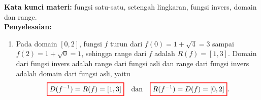 \documentclass[10pt,openany,a4paper]{article}
\theoremstyle{definition}
\theoremstyle{definition}
\theoremstyle{plain}
\newenvironment{jawab}[2][tes]{%
\par\noindent\textbf{Kata kunci materi:} #1.\\
\textbf{Penyelesaian:} #2%
}{}
\begin{document}
\begin{enumerate}
\begin{jawab}[fungsi satu-satu, setengah lingkaran, fungsi invers, domain dan range]
{\begin{enumerate}
\begin{align*}
                \colorlet{oldcolor}{.}
        \color{red}
        \setlength{\fboxrule}{1pt} \boxed{\color{oldcolor}f^{-1}(x) = \sqrt{4-(x-1)^2} = \sqrt{3+2x-x^2}}\color{oldcolor}.
            \end{align*}
            \item Pada domain $[0,2]$, fungsi $f$ turun dari $f(0)=1+\sqrt{4}=3$ sampai $f(2)=1+\sqrt{0}=1$, sehingga range dari $f$ adalah $R(f)=[1,3]$. Domain dari fungsi invers adalah range dari fungsi asli dan range dari fungsi invers adalah domain dari fungsi asli, yaitu
            \begin{align*}
                \colorlet{oldcolor}{.}
        \color{red}
        \setlength{\fboxrule}{1pt} \boxed{\color{oldcolor}D(f^{-1}) = R(f) = [1, 3]}\color{oldcolor} \quad\text{dan}\quad \colorlet{oldcolor}{.}
        \color{red}
        \setlength{\fboxrule}{1pt} \boxed{\color{oldcolor}R(f^{-1}) = D(f) = [0, 2]}\color{oldcolor}.
            \end{align*}
        \end{enumerate}
    }
    \end{jawab}


\end{enumerate}
\end{document}

